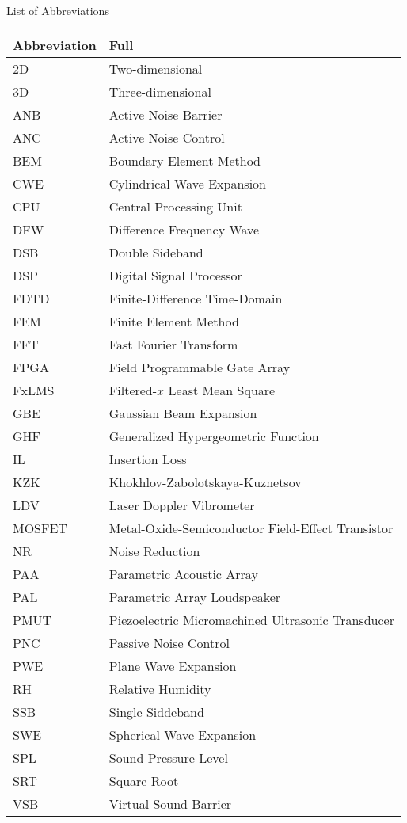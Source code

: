 \begin{frontmatterpage}{List of Abbreviations}
\begin{longtable}{ll} %
    \toprule
    \textbf{Abbreviation} & \textbf{Full} \\
    \midrule
    {2D} & Two-dimensional \\ 
    3D & Three-dimensional \\ 
    ANB & Active Noise Barrier\\
    ANC& Active Noise Control\\
    BEM & Boundary Element Method\\
    CWE & Cylindrical Wave Expansion \\
    CPU & Central Processing Unit\\
    DFW & Difference Frequency Wave \\ 
    DSB & Double Sideband \\ 
    DSP & Digital Signal Processor\\
    FDTD & Finite-Difference Time-Domain\\
    FEM & Finite Element Method\\
    FFT & Fast Fourier Transform\\
    FPGA & Field Programmable Gate Array\\
    FxLMS & \mbox{Filtered-}$x$ Least Mean Square\\
    GBE & Gaussian Beam Expansion\\
    GHF & Generalized Hypergeometric Function\\
    IL & Insertion Loss \\
    KZK & Khokhlov-Zabolotskaya-Kuznetsov\\
    LDV & Laser Doppler Vibrometer \\
    MOSFET & Metal-Oxide-Semiconductor Field-Effect Transistor\\
    NR & Noise Reduction \\ 
    PAA & Parametric Acoustic Array\\
    PAL & Parametric Array Loudspeaker\\
    PMUT & Piezoelectric Micromachined Ultrasonic Transducer\\
    PNC & Passive Noise Control\\
    PWE & Plane Wave Expansion \\
    RH & Relative Humidity\\
    SSB & Single Siddeband\\
    SWE & Spherical Wave Expansion \\ 
    SPL & Sound Pressure Level\\
    SRT & Square Root\\
    VSB & Virtual Sound Barrier\\
    \bottomrule
\end{longtable}

\end{frontmatterpage}
